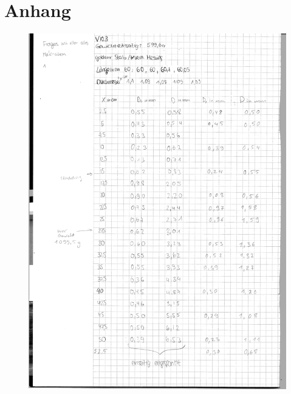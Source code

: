 \section{Anhang}
\begin{figure}
    \centering
    \includegraphics[width=\textwidth]{103_1.pdf}
\end{figure}
